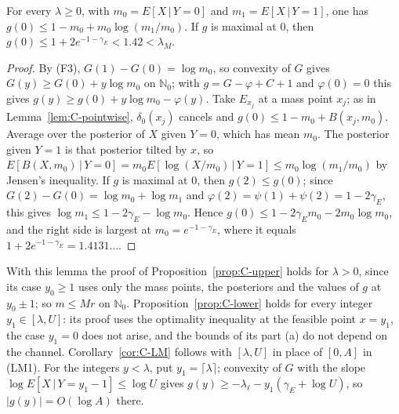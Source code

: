 \begin{lemma}\label{lem:C-zero}
For every $\lambda\ge0$, with $m_0=E[X\,|\,Y=0]$ and $m_1=E[X\,|\,Y=1]$, one has $g(0)\le1-m_0+m_0\log(m_1/m_0)$. If $g$ is maximal
at $0$, then $g(0)\le1+2e^{-1-\gamma_E}<1.42<\lambda_M$.
\end{lemma}
\begin{proof}
By (F3), $G(1)-G(0)=\log m_0$, so convexity of $G$ gives $G(y)\ge G(0)+y\log m_0$ on $\mathbb N_0$; with $g=G-\varphi+C+1$ and
$\varphi(0)=0$ this gives $g(y)\ge g(0)+y\log m_0-\varphi(y)$. Take $E_{x_j}$ at a mass point $x_j$; as in Lemma~\ref{lem:C-pointwise},
$\delta_0(x_j)$ cancels and $g(0)\le1-m_0+B(x_j,m_0)$. Average over the posterior of $X$ given $Y=0$, which has mean $m_0$. The posterior
given $Y=1$ is that posterior tilted by $x$, so $E[B(X,m_0)\,|\,Y=0]=m_0E[\log(X/m_0)\,|\,Y=1]\le m_0\log(m_1/m_0)$ by Jensen's
inequality. If $g$ is maximal at $0$, then $g(2)\le g(0)$; since $G(2)-G(0)=\log m_0+\log m_1$ and $\varphi(2)=\psi(1)+\psi(2)=1-2\gamma_E$,
this gives $\log m_1\le1-2\gamma_E-\log m_0$. Hence $g(0)\le1-2\gamma_Em_0-2m_0\log m_0$, and the right side is largest at
$m_0=e^{-1-\gamma_E}$, where it equals $1+2e^{-1-\gamma_E}=1.4131\ldots$.
\end{proof}

With this lemma the proof of Proposition~\ref{prop:C-upper} holds for $\lambda>0$, since its case $y_0\ge1$ uses only the mass points,
the posteriors and the values of $g$ at $y_0\pm1$; so $m\le Mr$ on $\mathbb N_0$. Proposition~\ref{prop:C-lower} holds for every integer
$y_1\in[\lambda,U]$: its proof uses the optimality inequality at the feasible point $x=y_1$, the case $y_1=0$ does not arise, and the
bounds of its part (a) do not depend on the channel. Corollary~\ref{cor:C-LM} follows with $[\lambda,U]$ in place of $[0,A]$ in (LM1).
For the integers $y<\lambda$, put $y_1=\lceil\lambda\rceil$; convexity of $G$ with the slope $\log E[X\,|\,Y=y_1-1]\le\log U$ gives
$g(y)\ge-\lambda_\ell-y_1(\gamma_E+\log U)$, so $|g(y)|=O(\log A)$ there.

